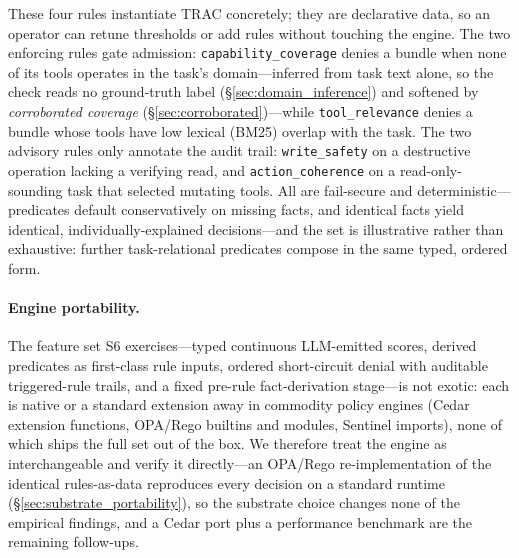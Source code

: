 \documentclass[sigconf,review,anonymous]{acmart}
\begin{document}
These four rules instantiate TRAC concretely; they are declarative data, so an operator can retune thresholds or add rules without touching the engine. The two enforcing rules gate admission: \texttt{capability\_coverage} denies a bundle when none of its tools operates in the task's domain---inferred from task text alone, so the check reads no ground-truth label (\S\ref{sec:domain_inference}) and softened by \emph{corroborated coverage} (\S\ref{sec:corroborated})---while \texttt{tool\_relevance} denies a bundle whose tools have low lexical (BM25) overlap with the task. The two advisory rules only annotate the audit trail: \texttt{write\_safety} on a destructive operation lacking a verifying read, and \texttt{action\_coherence} on a read-only-sounding task that selected mutating tools. All are fail-secure and deterministic---predicates default conservatively on missing facts, and identical facts yield identical, individually-explained decisions---and the set is illustrative rather than exhaustive: further task-relational predicates compose in the same typed, ordered form.

\paragraph{Engine portability.} The feature set S6 exercises---typed continuous LLM-emitted scores, derived predicates as first-class rule inputs, ordered short-circuit denial with auditable triggered-rule trails, and a fixed pre-rule fact-derivation stage---is not exotic: each is native or a standard extension away in commodity policy engines (Cedar extension functions, OPA/Rego builtins and modules, Sentinel imports), none of which ships the full set out of the box. We therefore treat the engine as interchangeable and verify it directly---an OPA/Rego re-implementation of the identical rules-as-data reproduces every decision on a standard runtime (\S\ref{sec:substrate_portability}), so the substrate choice changes none of the empirical findings, and a Cedar port plus a performance benchmark are the remaining follow-ups.
\end{document}
